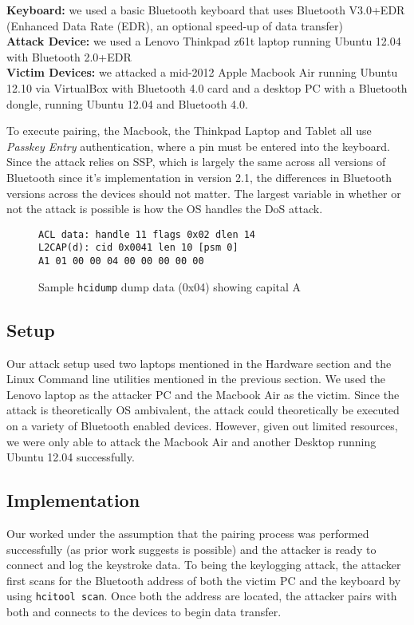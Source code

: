 \documentclass{acm_proc_article-sp}
\begin{document}
\textbf{Keyboard:} we used a basic Bluetooth keyboard that uses Bluetooth V3.0+EDR (Enhanced Data Rate (EDR), an optional speed-up of data transfer)\\
\textbf{Attack Device:} we used a Lenovo Thinkpad z61t laptop running Ubuntu 12.04 with Bluetooth 2.0+EDR\\
\textbf{Victim Devices:} we attacked a mid-2012 Apple Macbook Air running Ubuntu 12.10 via VirtualBox with
Bluetooth 4.0 card and a desktop PC with a Bluetooth dongle, running Ubuntu 12.04 and Bluetooth 4.0.

To execute pairing, the Macbook, the Thinkpad Laptop and Tablet all use \textit{Passkey Entry} authentication, where a pin must be entered into the keyboard. Since the attack relies on SSP, which is largely the same across all versions of Bluetooth since it's implementation in version 2.1, the differences in Bluetooth versions across the devices should not matter. The largest variable in whether or not the attack is possible is how the OS handles the DoS attack.
\begin{figure}
\begin{verbatim}
ACL data: handle 11 flags 0x02 dlen 14
L2CAP(d): cid 0x0041 len 10 [psm 0]
A1 01 00 00 04 00 00 00 00 00
\end{verbatim}
\caption{Sample \texttt{hcidump} dump data (0x04) showing capital A}
\label{fig:mypic}
\end{figure}

\subsection{Setup}
Our attack setup used two laptops mentioned in the Hardware section and the Linux Command line utilities mentioned in the previous section. We used the Lenovo laptop as the attacker PC and the Macbook Air as the victim. Since the attack is theoretically OS ambivalent, the attack could theoretically be executed on a variety of Bluetooth enabled devices. However, given out limited resources, we were only able to attack the Macbook Air and another Desktop running Ubuntu 12.04 successfully.

\subsection{Implementation}
Our worked under the assumption that the pairing process was performed successfully (as prior work suggests is possible) and the attacker is ready to connect and log the keystroke data. To being the keylogging attack, the attacker first scans for the Bluetooth address of both the victim PC and the keyboard by using \texttt{hcitool scan}. Once both the address are located, the attacker pairs with both and connects to the devices to begin data transfer.
\end{document}
